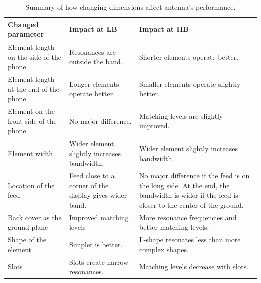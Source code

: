 \begin{table}[H]
    \centering
    \caption{Summary of how changing dimensions affect antenna's performance.}
    \label{tab:dimension_summary}
    \begin{tabular}{|p{}|p{}|p{}|}
        \hline
        \textbf{Changed parameter} & \textbf{Impact at LB} & \textbf{Impact at HB}\\
        \hline
        Element length on the side of the phone & Resonances are outside the band. & Shorter elements operate better.\\
        \hline
        Element length at the end of the phone & Longer elements operate better. & Smaller elements operate slightly better.\\
        \hline
        Element on the front side of the phone & No major difference. & Matching levels are slightly improved.\\
        \hline
        Element width & Wider element slightly increases bandwidth. & Wider element slightly increases bandwidth.\\
        \hline
        Location of the feed & Feed close to a corner of the display gives wider band. & No major difference if the feed is on the long side. At the end, the bandwidth is wider if the feed is closer to the center of the ground.\\
        \hline
        Back cover as the ground plane & Improved matching levels & More resonance frequencies and better matching levels.\\
        \hline
        Shape of the element & Simpler is better. & L-shape resonates less than more complex shapes.\\
        \hline
        Slots & Slots create narrow resonances. & Matching levels decrease with slots.\\
        \hline
    \end{tabular}
\end{table} 

\clearpage